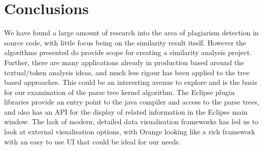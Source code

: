 \section{Conclusions}

We have found a large amount of research into the area of plagiarism detection
in source code, with little focus being on the similarity result itself. However
the algorithms presented do provide scope for creating a similarity analysis
project. Further, there are many applications already in production based around
the textual/token analysis ideas, and much less rigour has been applied to the
tree based approaches. This could be an interesting avenue to explore and is the
basis for our examination of the parse tree kernel algorithm. The Eclipse plugin
libraries provide an entry point to the java compiler and access to the parse
trees, and also has an API for the display of related information in the Eclipse
main window. The lack of modern, detailed data visualisation frameworks has led
us to look at external visualisation options, with Orange looking like a rich
framework with an easy to use UI that could be ideal for our needs.